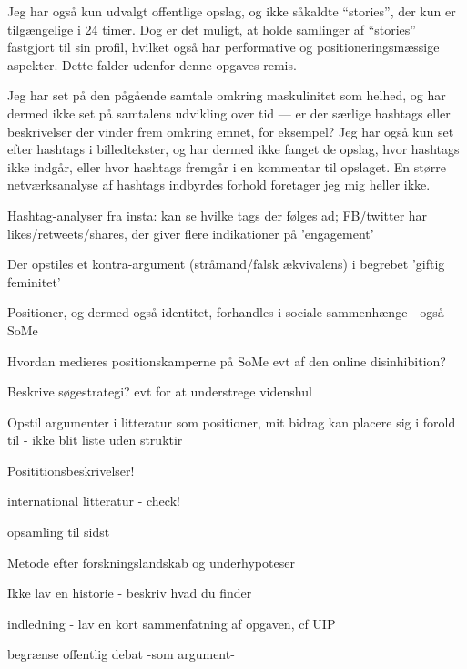Jeg har også kun udvalgt offentlige opslag, og ikke såkaldte 
“stories”, der kun er tilgængelige i 24 timer. Dog er det muligt, 
at holde samlinger af “stories” fastgjort til sin profil, hvilket 
også har performative og positioneringsmæssige aspekter. Dette 
falder udenfor denne opgaves remis.

Jeg har set på den pågående samtale omkring maskulinitet som 
helhed, og har dermed ikke set på samtalens udvikling over tid — 
er der særlige hashtags eller beskrivelser der vinder frem omkring 
emnet, for eksempel? Jeg har også kun set efter hashtags i 
billedtekster, og har dermed ikke fanget de opslag, hvor hashtags 
ikke indgår, eller hvor hashtags fremgår i en kommentar til 
opslaget. En større netværksanalyse af hashtags indbyrdes forhold 
foretager jeg mig heller ikke.




Hashtag-analyser fra insta: kan se hvilke tags der følges ad;
FB/twitter har likes/retweets/shares, der giver flere indikationer
på 'engagement'

Der opstiles et kontra-argument (stråmand/falsk ækvivalens) i
begrebet 'giftig feminitet'

Positioner, og dermed også identitet, forhandles i sociale
sammenhænge - også SoMe 

Hvordan medieres positionskamperne på SoMe evt af den online
disinhibition?

Beskrive søgestrategi? evt for at understrege videnshul

Opstil argumenter i litteratur som positioner, mit bidrag kan
placere sig i forold til - ikke blit liste uden struktir

Posititionsbeskrivelser!

international litteratur - check! 

opsamling til sidst

Metode efter forskningslandskab og underhypoteser

Ikke lav en historie - beskriv hvad du finder

indledning - lav en kort sammenfatning af opgaven, cf UIP

begrænse offentlig debat -som argument-
